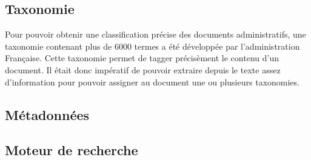 \subsection{Taxonomie}
Pour pouvoir obtenir une classification précise des documents administratifs, une taxonomie contenant plus de 6000 termes a été développée par l'administration Française. Cette taxonomie permet de tagger précisèment le contenu d'un document. Il était donc impératif de pouvoir extraire depuis le texte assez d'information pour pouvoir assigner au document une ou plusieurs taxonomies.

\subsection{Métadonnées}
\subsection{Moteur de recherche}
